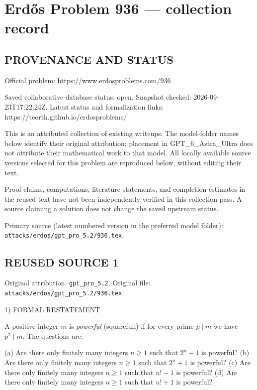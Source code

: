 \section*{Erd\H{o}s Problem 936 --- collection record}

\subsection*{PROVENANCE AND STATUS}
Official problem: https://www.erdosproblems.com/936

Saved collaborative-database status: open.
Snapshot checked: 2026-09-23T17:22:24Z.
Latest status and formalization links: https://teorth.github.io/erdosproblems/

This is an attributed collection of existing writeups. The model-folder names below identify their original attribution; placement in GPT\_6\_Astra\_Ultra does not attribute their mathematical work to that model. All locally available source versions selected for this problem are reproduced below, without editing their text.

Proof claims, computations, literature statements, and completion estimates in the reused text have not been independently verified in this collection pass. A source claiming a solution does not change the saved upstream status.

Primary source (latest numbered version in the preferred model folder): \texttt{attacks/erdos/gpt\_pro\_5.2/936.tex}.

\subsection*{REUSED SOURCE 1}
Original attribution: \texttt{gpt\_pro\_5.2}.
Original file: \texttt{attacks/erdos/gpt\_pro\_5.2/936.tex}.


1) FORMAL RESTATEMENT

A positive integer \(m\) is \emph{powerful} (squarefull) if for every prime \(p\mid m\) we have \(p^2\mid m\).
The questions are:

(a) Are there only finitely many integers \(n\ge 1\) such that \(2^n-1\) is powerful?
(b) Are there only finitely many integers \(n\ge 1\) such that \(2^n+1\) is powerful?
(c) Are there only finitely many integers \(n\ge 1\) such that \(n!-1\) is powerful?
(d) Are there only finitely many integers \(n\ge 1\) such that \(n!+1\) is powerful?

